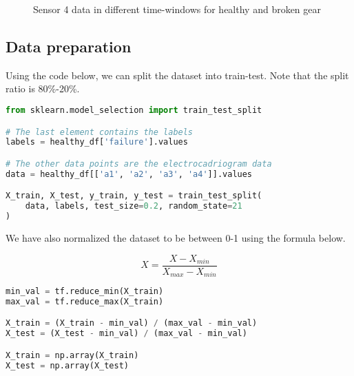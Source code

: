 \begin{figure}[H]
\centering
\subfloat{\texttt{[image: s4]}}
\caption{Sensor 4 data in different time-windows for healthy and broken gear}
\end{figure}

\subsection*{Data preparation}

Using the code below, we can split the dataset into train-test. Note that the split ratio is 80\%-20\%. 

\begin{center}{\begin{minipage}{0.9\linewidth}
\begin{lstlisting}[language=Python, basicstyle=\fontsize{10}{10}\selectfont\ttfamily]
from sklearn.model_selection import train_test_split

# The last element contains the labels
labels = healthy_df['failure'].values

# The other data points are the electrocadriogram data
data = healthy_df[['a1', 'a2', 'a3', 'a4']].values

X_train, X_test, y_train, y_test = train_test_split(
    data, labels, test_size=0.2, random_state=21
)
\end{lstlisting}
\end{minipage}}\end{center}

We have also normalized the dataset to be between 0-1 using the formula below. 

\begin{equation}
X = \frac{X-X_{min}}{X_{max}-X_{min}}
\end{equation}

\begin{center}{\begin{minipage}{0.9\linewidth}
\begin{lstlisting}[language=Python, basicstyle=\fontsize{10}{10}\selectfont\ttfamily]
min_val = tf.reduce_min(X_train)
max_val = tf.reduce_max(X_train)

X_train = (X_train - min_val) / (max_val - min_val)
X_test = (X_test - min_val) / (max_val - min_val)

X_train = np.array(X_train)
X_test = np.array(X_test)
\end{lstlisting}
\end{minipage}}\end{center}

